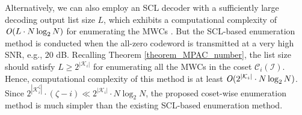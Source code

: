 \documentclass[12pt, draftclsnofoot, peerreview, onecolumn]{IEEEtran}
\theoremstyle{noparent}
\begin{document}
Alternatively, we can also employ an SCL decoder with a sufficiently large decoding output list size $L$, 
which exhibits a computational complexity of ${\it O}(L\cdot N \log_2 N)$ for
enumerating the MWCs \cite{Li2012AdaptiveSuccessiveCancellation}.
But the SCL-based enumeration method is conducted when the all-zero codeword is transmitted at 
a very high SNR, e.g., $20$ dB.
Recalling Theorem \ref{theorem_MPAC_number},
the list size should satisfy $L\geq 2^{|\mathcal{K}_i|}$ for enumerating all
the MWCs in the coset $\mathcal{C}_i(\mathcal{I})$.
Hence, computational complexity of this method is at least
${\it O}(2^{|\mathcal{K}_i|}\cdot N\log_2 N)$.
Since
$2^{|\mathcal{K}_i^{\zeta}|}\cdot (\zeta-i)\ll 2^{|\mathcal{K}_i|}\cdot N\log_2 N$,
the proposed coset-wise enumeration method is much simpler 
than the existing SCL-based enumeration method.
\end{document}
